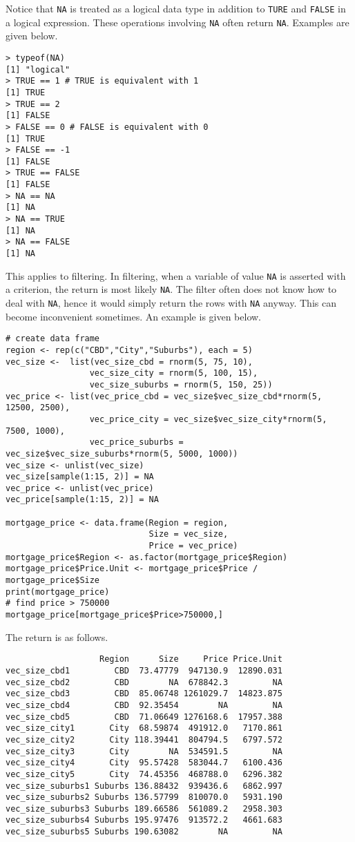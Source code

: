 Notice that \verb|NA| is treated as a logical data type in addition to \verb|TURE| and \verb|FALSE| in a logical expression. These operations involving \verb|NA| often return \verb|NA|. Examples are given below.
\begin{lstlisting}
> typeof(NA)
[1] "logical"
> TRUE == 1 # TRUE is equivalent with 1
[1] TRUE
> TRUE == 2
[1] FALSE
> FALSE == 0 # FALSE is equivalent with 0
[1] TRUE
> FALSE == -1
[1] FALSE
> TRUE == FALSE
[1] FALSE
> NA == NA
[1] NA
> NA == TRUE
[1] NA
> NA == FALSE
[1] NA
\end{lstlisting}
This applies to filtering. In filtering, when a variable of value \verb|NA| is asserted with a criterion, the return is most likely \verb|NA|. The filter often does not know how to deal with \verb|NA|, hence it would simply return the rows with \verb|NA| anyway. This can become inconvenient sometimes. An example is given below.
\begin{lstlisting}
# create data frame
region <- rep(c("CBD","City","Suburbs"), each = 5)
vec_size <-  list(vec_size_cbd = rnorm(5, 75, 10),
                 vec_size_city = rnorm(5, 100, 15),
                 vec_size_suburbs = rnorm(5, 150, 25))
vec_price <- list(vec_price_cbd = vec_size$vec_size_cbd*rnorm(5, 12500, 2500),
                 vec_price_city = vec_size$vec_size_city*rnorm(5, 7500, 1000),
                 vec_price_suburbs = vec_size$vec_size_suburbs*rnorm(5, 5000, 1000))
vec_size <- unlist(vec_size)
vec_size[sample(1:15, 2)] = NA
vec_price <- unlist(vec_price)
vec_price[sample(1:15, 2)] = NA

mortgage_price <- data.frame(Region = region,
                             Size = vec_size,
                             Price = vec_price)
mortgage_price$Region <- as.factor(mortgage_price$Region)
mortgage_price$Price.Unit <- mortgage_price$Price / mortgage_price$Size
print(mortgage_price)
# find price > 750000
mortgage_price[mortgage_price$Price>750000,]
\end{lstlisting}
The return is as follows.
\begin{lstlisting}
                   Region      Size     Price Price.Unit
vec_size_cbd1         CBD  73.47779  947130.9  12890.031
vec_size_cbd2         CBD        NA  678842.3         NA
vec_size_cbd3         CBD  85.06748 1261029.7  14823.875
vec_size_cbd4         CBD  92.35454        NA         NA
vec_size_cbd5         CBD  71.06649 1276168.6  17957.388
vec_size_city1       City  68.59874  491912.0   7170.861
vec_size_city2       City 118.39441  804794.5   6797.572
vec_size_city3       City        NA  534591.5         NA
vec_size_city4       City  95.57428  583044.7   6100.436
vec_size_city5       City  74.45356  468788.0   6296.382
vec_size_suburbs1 Suburbs 136.88432  939436.6   6862.997
vec_size_suburbs2 Suburbs 136.57799  810070.0   5931.190
vec_size_suburbs3 Suburbs 189.66586  561089.2   2958.303
vec_size_suburbs4 Suburbs 195.97476  913572.2   4661.683
vec_size_suburbs5 Suburbs 190.63082        NA         NA
\end{lstlisting}
